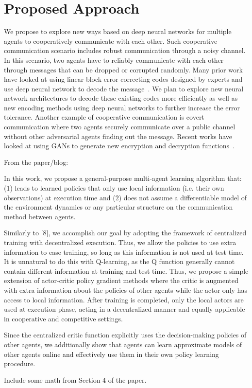 
\section{Proposed Approach}
\label{sec:direction}

We propose to explore new ways based on deep neural networks for multiple
agents to cooperatively communicate with each other. Such cooperative
communication scenario includes robust communication through a noisy channel.
In this scenario, two agents have to reliably communicate with each other
through messages that can be dropped or corrupted randomly. Many prior work
have looked at using linear block error correcting codes designed by experts
and use deep neural network to decode the message~\cite{nachmani2016learning,
nachmani2017rnn}. We plan to explore new neural network architectures to
decode these existing codes more efficiently as well as new encoding methods
using deep neural networks to further increase the error tolerance. Another
example of cooperative communication is covert communication where two agents
securely communicate over a public channel without other adversarial agents
finding out the message. Recent works have looked at using GANs to generate
new encryption and decryption functions~\cite{abadi2016learning}.

From the paper/blog:

In this work, we propose a general-purpose multi-agent learning algorithm
that: (1) leads to learned policies that only use local information (i.e.
their own observations) at execution time and (2) does not assume a
differentiable model of the environment dynamics or any particular structure
on the communication method between agents.

Similarly to [8], we accomplish our goal by adopting the framework of
centralized training with decentralized execution. Thus, we allow the policies
to use extra information to ease training, so long as this information is not
used at test time. It is unnatural to do this with Q-learning, as the Q
function generally cannot contain different information at training and test
time. Thus, we propose a simple extension of actor-critic policy gradient
methods where the critic is augmented with extra information about the
policies of other agents while the actor only has access to local information.
After training is completed, only the local actors are used at execution
phase, acting in a decentralized manner and equally applicable in cooperative
and competitive settings.

Since the centralized critic function explicitly uses the decision-making
policies of other agents, we additionally show that agents can learn
approximate models of other agents online and effectively use them in their
own policy learning procedure.

Include some math from Section 4 of the paper. 
